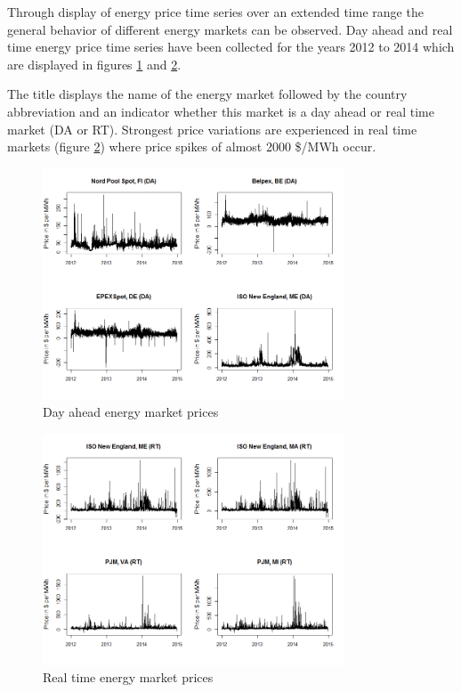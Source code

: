 Through display of energy price time series over an extended time range the general behavior of different energy markets can be observed. Day ahead and real time energy price time series have been collected for the years 2012 to 2014 which are displayed in figures \ref{fig:da_energy_markets_2012_2014} and \ref{fig:rt_energy_markets_2012_2014}. 

The title displays the name of the energy market followed by the country abbreviation and an indicator whether this market is a day ahead or real time market (DA or RT). Strongest price variations are experienced in real time markets (figure \ref{fig:rt_energy_markets_2012_2014}) where price spikes of almost 2000 \$/MWh occur. 


\begin{figure}[htbp]
	\centering
		\includegraphics[width=0.8\textwidth]{figures/data_analysis/da_energy_markets_2012_2014.png}
	\caption{Day ahead energy market prices}
	\label{fig:da_energy_markets_2012_2014}
\end{figure}

\begin{figure}[htbp]
	\centering
		\includegraphics[width=0.8\textwidth]{figures/data_analysis/rt_energy_markets_2012_2014.png}
	\caption{Real time energy market prices}
	\label{fig:rt_energy_markets_2012_2014}
\end{figure}

